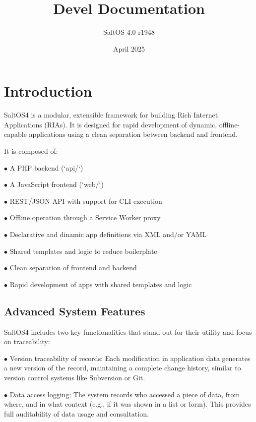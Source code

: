 \documentclass[a4paper]{article}
\title{Devel Documentation}
\author{SaltOS 4.0 r1948}
\begin{document}
\date{April 2025}
\maketitle
\clearpage

\tableofcontents
\clearpage


\hypertarget{toc1}{}
\section{Introduction}

SaltOS4 is a modular, extensible framework for building Rich Internet Applications (RIAs). It is designed for rapid development of dynamic, offline-capable applications using a clean separation between backend and frontend.

It is composed of:

\begin{compactitem}
\item[\color{myblue}$\bullet$] A PHP backend (`api/`)
\item[\color{myblue}$\bullet$] A JavaScript frontend (`web/`)
\item[\color{myblue}$\bullet$] REST/JSON API with support for CLI execution
\item[\color{myblue}$\bullet$] Offline operation through a Service Worker proxy
\item[\color{myblue}$\bullet$] Declarative and dinamic app definitions via XML and/or YAML
\item[\color{myblue}$\bullet$] Shared templates and logic to reduce boilerplate
\item[\color{myblue}$\bullet$] Clean separation of frontend and backend
\item[\color{myblue}$\bullet$] Rapid development of apps with shared templates and logic
\end{compactitem}

\hypertarget{toc2}{}
\subsection{Advanced System Features}

SaltOS4 includes two key functionalities that stand out for their utility and focus on traceability:

\begin{compactitem}
\item[\color{myblue}$\bullet$] Version traceability of records: Each modification in application data generates a new version of the record, maintaining a complete change history, similar to version control systems like Subversion or Git.
\item[\color{myblue}$\bullet$] Data access logging: The system records who accessed a piece of data, from where, and in what context (e.g., if it was shown in a list or form). This provides full auditability of data usage and consultation.
\end{compactitem}
\end{document}
